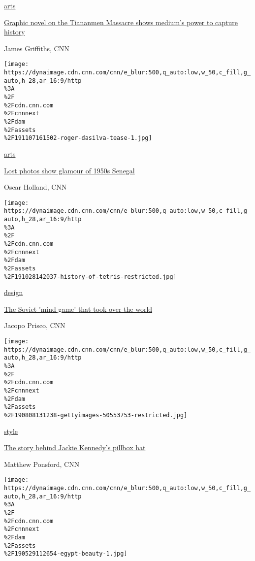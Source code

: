 \href{/style/arts}{arts}

\href{/style/article/tiananmen-square-massacre-graphic-novel-comics-journalism-intl-hnk/index.html}{Graphic
novel on the Tiananmen Massacre shows medium's power to capture history}

James Griffiths, CNN

\href{/style/article/senegal-roger-dasilva/index.html}{}

\texttt{[image: https://dynaimage.cdn.cnn.com/cnn/e\_blur:500,q\_auto:low,w\_50,c\_fill,g\_auto,h\_28,ar\_16:9/http\\\%3A\\\%2F\\\%2Fcdn.cnn.com\\\%2Fcnnnext\\\%2Fdam\\\%2Fassets\\\%2F191107161502-roger-dasilva-tease-1.jpg]}

\href{/style/arts}{arts}

\href{/style/article/senegal-roger-dasilva/index.html}{Lost photos show
glamour of 1950s Senegal}

Oscar Holland, CNN

\href{/style/article/tetris-video-game-history/index.html}{}

\texttt{[image: https://dynaimage.cdn.cnn.com/cnn/e\_blur:500,q\_auto:low,w\_50,c\_fill,g\_auto,h\_28,ar\_16:9/http\\\%3A\\\%2F\\\%2Fcdn.cnn.com\\\%2Fcnnnext\\\%2Fdam\\\%2Fassets\\\%2F191028142037-history-of-tetris-restricted.jpg]}

\href{/style/design}{design}

\href{/style/article/tetris-video-game-history/index.html}{The Soviet
'mind game' that took over the world}

Jacopo Prisco, CNN

\href{/style/article/jackie-kennedy-inauguration-pillbox-hat-remember-when/index.html}{}

\texttt{[image: https://dynaimage.cdn.cnn.com/cnn/e\_blur:500,q\_auto:low,w\_50,c\_fill,g\_auto,h\_28,ar\_16:9/http\\\%3A\\\%2F\\\%2Fcdn.cnn.com\\\%2Fcnnnext\\\%2Fdam\\\%2Fassets\\\%2F190808131238-gettyimages-50553753-restricted.jpg]}

\href{/style}{style}

\href{/style/article/jackie-kennedy-inauguration-pillbox-hat-remember-when/index.html}{The
story behind Jackie Kennedy's pillbox hat}

Matthew Ponsford, CNN

\href{/style/article/ancient-egypt-beauty-ritual-artsy/index.html}{}

\texttt{[image: https://dynaimage.cdn.cnn.com/cnn/e\_blur:500,q\_auto:low,w\_50,c\_fill,g\_auto,h\_28,ar\_16:9/http\\\%3A\\\%2F\\\%2Fcdn.cnn.com\\\%2Fcnnnext\\\%2Fdam\\\%2Fassets\\\%2F190529112654-egypt-beauty-1.jpg]}

